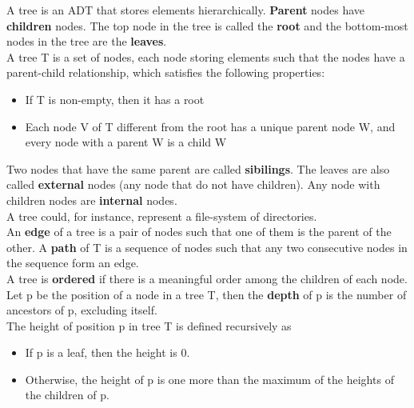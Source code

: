 \documentclass[]{article}
\begin{document}
A tree is an ADT that stores elements hierarchically. \textbf{Parent} nodes have \textbf{children} nodes. The top node in the tree is called the \textbf{root} and the bottom-most nodes in the tree are the \textbf{leaves}.\\


A tree T is a set of nodes, each node storing elements such that the nodes have a parent-child relationship, which satisfies the following properties:

\begin{itemize}
	\item If T is non-empty, then it has a root
	\item Each node V of T different from the root has a unique parent node W, and every node with a parent W is a child W
\end{itemize}\bigbreak

Two nodes that have the same parent are called \textbf{sibilings}. The leaves are also called \textbf{external} nodes (any node that do not have children). Any node with children nodes are \textbf{internal} nodes.\\

A tree could, for instance, represent a file-system of directories.\\

An \textbf{edge} of a tree is a pair of nodes such that one of them is the parent of the other. A \textbf{path} of T is a sequence of nodes such that any two consecutive nodes in the sequence form an edge.\\

A tree is \textbf{ordered} if there is a meaningful order among the children of each node.\\

Let p be the position of a node in a tree T, then the \textbf{depth} of p is the number of ancestors of p, excluding itself.\\

The height of position p in tree T is defined recursively as

\begin{itemize}
	\item If p is a leaf, then the height is 0.
	\item Otherwise, the height of p is one more than the maximum of the heights of the children of p.
\end{itemize}\bigbreak
\end{document}

